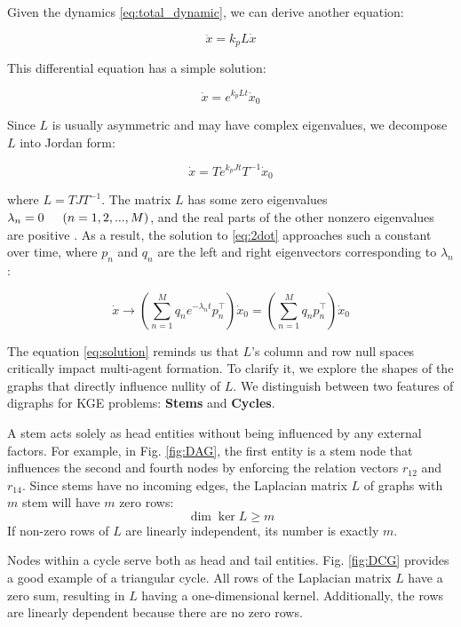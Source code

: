 \documentclass[letterpaper, 10 pt, conference]{ieeeconf}  %
\begin{document}
Given the dynamics \eqref{eq:total_dynamic}, we can derive another equation:

\begin{equation}
    \ddot{x} = k_p L \dot{x}
    \label{eq:2dot}
\end{equation}

\noindent This differential equation has a simple solution:

\[
    \dot{x} = e^{k_p Lt} \dot{x}_0
\]

\noindent Since \( L \) is usually asymmetric and may have complex eigenvalues, we decompose \( L \) into Jordan form:

\[
    \dot{x} = Te^{k_p Jt}T^{-1} \dot{x}_0
\]

\noindent where \( L = TJT^{-1} \). The matrix \( L \) has some zero eigenvalues \( \lambda_n = 0 \indent (n = 1,2,...,M) \), and the real parts of the other nonzero eigenvalues are positive \cite{mirzaev_laplacian_2013}. As a result, the solution to \eqref{eq:2dot} approaches such a constant over time, where \( p_n \) and \( q_n \) are the left and right eigenvectors corresponding to \( \lambda_n \):

\begin{equation}
    \dot{x} \rightarrow (\sum_{n=1}^M q_n e^{-\lambda_n t}p_n^\top) \dot{x}_0 = (\sum_{n=1}^M q_n p_n^\top )\dot{x}_0
    \label{eq:solution}
\end{equation}

\noindent The equation \eqref{eq:solution} reminds us that $L$'s column and row null spaces critically impact multi-agent formation. 
To clarify it, we explore the shapes of the graphs that directly influence nullity of \( L\). We distinguish between two features of digraphs for KGE problems: \textbf{Stems} and \textbf{Cycles}.

A stem acts solely as head entities without being influenced by any external factors. For example, in Fig. \ref{fig:DAG}, the first entity is a stem node that influences the second and fourth nodes by enforcing the relation vectors \( r_{12} \) and \( r_{14} \). Since stems have no incoming edges, the Laplacian matrix \( L \) of graphs with \( m \) stem will have \( m \) zero rows:
\[
    \dim \ker L \geq m
\]
If non-zero rows of $L$ are linearly independent, its number is exactly $m$. 

Nodes within a cycle serve both as head and tail entities. Fig. \ref{fig:DCG} provides a good example of a triangular cycle. All rows of the Laplacian matrix \( L \) have a zero sum, resulting in \( L \) having a one-dimensional kernel. Additionally, the rows are linearly dependent because there are no zero rows.
\end{document}
